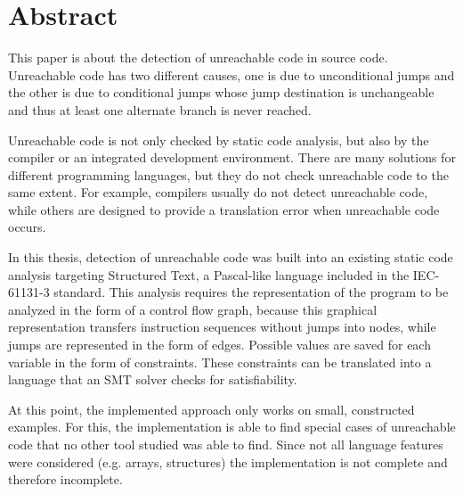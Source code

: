 \chapter{Abstract}
\label{cha:abstract}

This paper is about the detection of unreachable code in source code. 
Unreachable code has two different causes, one is due to unconditional jumps and the other is due to conditional jumps whose jump destination is unchangeable and thus at least one alternate branch is never reached.

Unreachable code is not only checked by static code analysis, but also by the compiler or an integrated development environment. There are many solutions for different programming languages, but they do not check unreachable code to the same extent. For example, compilers usually do not detect unreachable code, while others are designed to provide a translation error when unreachable code occurs.


In this thesis, detection of unreachable code was built into an existing static code analysis targeting Structured Text, a Pascal-like language included in the IEC-61131-3 standard. This analysis requires the representation of the program to be analyzed in the form of a control flow graph, because this graphical representation transfers instruction sequences without jumps into nodes, while jumps are represented in the form of edges. Possible values are saved for each variable in the form of constraints. These constraints can be translated into a language that an SMT solver checks for satisfiability. 

At this point, the implemented approach only works on small, constructed examples. For this, the implementation is able to find special cases of unreachable code that no other tool studied was able to find. Since not all language features were considered (e.g. arrays, structures) the implementation is not complete and therefore incomplete.
